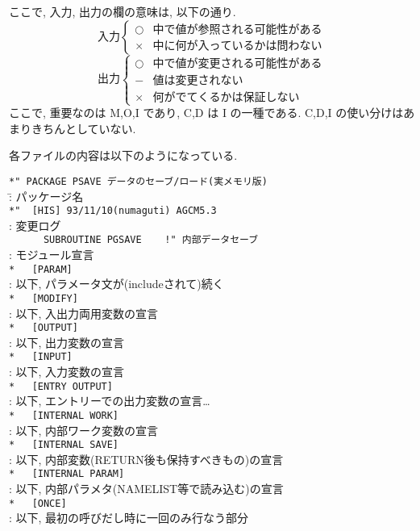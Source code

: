 \begin{center}
ここで, 入力, 出力の欄の意味は, 以下の通り.
\[
    入力 \left\{
    \begin{array}{ll}   
      ○ &  中で値が参照される可能性がある \\
      × &  中に何が入っているかは問わない
    \end{array}  
     \right.
\]
\[
    出力 \left\{
    \begin{array}{ll}   
      ○ &  中で値が変更される可能性がある \\
      − &  値は変更されない \\
      × &  何がでてくるかは保証しない
    \end{array}  
     \right.
\]
ここで, 重要なのは M,O,I であり, C,D は I の一種である.
C,D,I の使い分けはあまりきちんとしていない.
\end{center}

\・各ファイルの内容は以下のようになっている. 
\begin{tabbing}
\verb+*" PACKAGE PSAVE データのセーブ/ロード(実メモリ版) + \\
\hspace*{15mm}  \=  : パッケージ名      \\
\verb+*"  [HIS] 93/11/10(numaguti) AGCM5.3+ \\
                \>  : 変更ログ \\
\verb+      SUBROUTINE PGSAVE    !" 内部データセーブ+ \\
                \>  : モジュール宣言 \\
\verb+*   [PARAM]+ \\
                \>  : 以下, パラメータ文が(includeされて)続く \\
\verb+*   [MODIFY] + \\
                \>  : 以下, 入出力両用変数の宣言 \\
\verb+*   [OUTPUT] + \\
                \>  : 以下, 出力変数の宣言 \\
\verb+*   [INPUT] + \\
                \>  : 以下, 入力変数の宣言 \\
\verb+*   [ENTRY OUTPUT] + \\
                \>  : 以下, エントリーでの出力変数の宣言\ldots \\
\verb+*   [INTERNAL WORK] + \\
                \>  : 以下, 内部ワーク変数の宣言 \\
\verb+*   [INTERNAL SAVE]+ \\
                \>  : 以下, 内部変数(RETURN後も保持すべきもの)の宣言\\
\verb+*   [INTERNAL PARAM]+ \\
                \>  : 以下, 内部パラメタ(NAMELIST等で読み込む)の宣言\\
\verb+*   [ONCE]+ \\
                \>  : 以下, 最初の呼びだし時に一回のみ行なう部分 \\
\end{tabbing}

